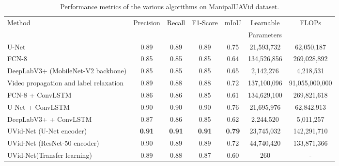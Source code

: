 \documentclass[journal]{IEEEtran}
\begin{document}
\begin{table*}[!h]
	\begin{center}
		\begin{tabular}{|l|c|c|c|c|c|c|}
			\hline
			Method & Precision&Recall&F1-Score &mIoU &Learnable & FLOPs\\
			&   &   &   &   &Parameters&\\
			\hline\hline
			U-Net \cite{2} &0.89&	0.89&	0.89	&	0.75&21,593,732 &62,050,187\\
			\hline
			FCN-8 \cite{4} & 0.85&	0.85&	0.85&		0.64&134,526,856& 269,028,892 \\
			\hline
			DeepLabV3+ (MobileNet-V2 backbone) \cite{33} &0.85&	0.85&	0.85&		0.65&2,142,276& 4,218,531\\
			\hline
			\hline
			Video propagation and label relaxation\cite{22}  &  0.89&0.88 &0.88 & 0.72&137,100,096&91,055,000,000\\
			\hline 
			FCN-8 + ConvLSTM \cite{wang2019deep}  &0.86 & 0.86&0.85 &0.61&134,629,100&269,821,618 \\
			\hline 
			U-Net + ConvLSTM & 0.90& 0.90& 0.90&0.76&21,695,976&62,842,913\\
			\hline
			DeepLabV3+ + ConvLSTM &0.87 &0.86 &0.85 &0.62&2,244,520&5,011,257\\
			\hline
			
			\hline
			UVid-Net (U-Net encoder)&\textbf{0.91}&	\textbf{0.91}&	\textbf{0.91}&		\textbf{0.79}&23,745,032&142,291,710\\
			\hline
			UVid-Net (ResNet-50 encoder)&0.90	&0.89	&0.89	&0.72&44,740,420&133,871,366\\
			\hline
			UVid-Net(Transfer learning) &0.89&0.88&0.87&0.60&260&-\\\hline
			
		\end{tabular}
	\end{center}
	\caption{Performance metrics of the various algorithms on ManipalUAVid dataset.}
	\label{table1}
\end{table*}
\end{document}
